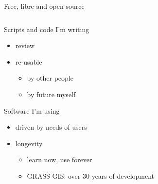 \documentclass[xcolor={dvipsnames,usenames},beamer,aspectratio=43]{beamer}
\begin{document}
\begin{frame}{Free, libre and open source}

\begin{columns}
\begin{column}{0.4\textwidth}

Scripts and code I'm writing

\begin{itemize}
  \item review
  \item re-usable
  \begin{itemize}
  \item by other people
  \item by future myself
  \end{itemize}
\end{itemize}

Software I'm using

\begin{itemize}
  \item driven by needs of users
  \item longevity
  \begin{itemize}
  \item learn now, use forever
  \item GRASS GIS: over 30 years of development
  \end{itemize}
\end{itemize}

\end{column}
\begin{column}{0.3\textwidth}


\end{column}
\end{columns}
\end{frame}
\end{document}
